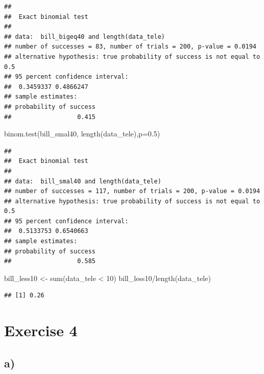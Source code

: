 \documentclass[
]{article}
\newenvironment{Shaded}{\begin{snugshade}}{\end{snugshade}}
\newcommand{\AttributeTok}[1]{\textcolor[rgb]{0.77,0.63,0.00}{#1}}
\newcommand{\DecValTok}[1]{\textcolor[rgb]{0.00,0.00,0.81}{#1}}
\newcommand{\FloatTok}[1]{\textcolor[rgb]{0.00,0.00,0.81}{#1}}
\newcommand{\FunctionTok}[1]{\textcolor[rgb]{0.00,0.00,0.00}{#1}}
\newcommand{\NormalTok}[1]{#1}
\newcommand{\OtherTok}[1]{\textcolor[rgb]{0.56,0.35,0.01}{#1}}
\newcommand{\SpecialCharTok}[1]{\textcolor[rgb]{0.00,0.00,0.00}{#1}}
\begin{document}
\begin{verbatim}
## 
##  Exact binomial test
## 
## data:  bill_bigeq40 and length(data_tele)
## number of successes = 83, number of trials = 200, p-value = 0.0194
## alternative hypothesis: true probability of success is not equal to 0.5
## 95 percent confidence interval:
##  0.3459337 0.4866247
## sample estimates:
## probability of success 
##                  0.415
\end{verbatim}

\begin{Shaded}
\begin{Highlighting}[]
\FunctionTok{binom.test}\NormalTok{(bill\_smal40, }\FunctionTok{length}\NormalTok{(data\_tele),}\AttributeTok{p=}\FloatTok{0.5}\NormalTok{)}
\end{Highlighting}
\end{Shaded}

\begin{verbatim}
## 
##  Exact binomial test
## 
## data:  bill_smal40 and length(data_tele)
## number of successes = 117, number of trials = 200, p-value = 0.0194
## alternative hypothesis: true probability of success is not equal to 0.5
## 95 percent confidence interval:
##  0.5133753 0.6540663
## sample estimates:
## probability of success 
##                  0.585
\end{verbatim}

\begin{Shaded}
\begin{Highlighting}[]
\NormalTok{bill\_less10 }\OtherTok{\textless{}{-}} \FunctionTok{sum}\NormalTok{(data\_tele }\SpecialCharTok{\textless{}} \DecValTok{10}\NormalTok{)}
\NormalTok{bill\_less10}\SpecialCharTok{/}\FunctionTok{length}\NormalTok{(data\_tele)}
\end{Highlighting}
\end{Shaded}

\begin{verbatim}
## [1] 0.26
\end{verbatim}

\hypertarget{exercise-4}{%
\section{Exercise 4}\label{exercise-4}}

\hypertarget{a-2}{%
\subsection{a)}\label{a-2}}
\end{document}
